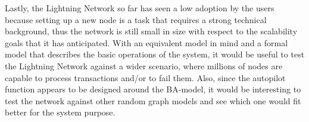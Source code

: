 	Lastly, the Lightning Network so far has seen a low adoption by the users because setting up a new node is a task that requires a strong technical background, thus the network is still small in size with respect to the scalability goals that it has anticipated. With an equivalent model in mind and a formal model that describes the basic operations of the system, it would be useful to test the Lightning Network against a wider scenario, where millions of nodes are capable to process transactions and/or to fail them. Also, since the autopilot function appears to be designed around the BA-model, it would be interesting to test the network against other random graph models and see which one would fit better for the system purpose.
	
